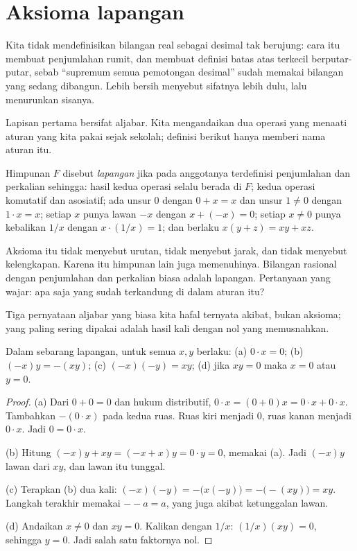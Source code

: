 \section{Aksioma lapangan}

Kita tidak mendefinisikan bilangan real sebagai desimal tak berujung: cara itu membuat
penjumlahan rumit, dan membuat definisi batas atas terkecil berputar-putar, sebab
``supremum semua pemotongan desimal'' sudah memakai bilangan yang sedang dibangun.
Lebih bersih menyebut sifatnya lebih dulu, lalu menurunkan sisanya.

Lapisan pertama bersifat aljabar. Kita mengandaikan dua operasi yang menaati aturan
yang kita pakai sejak sekolah; definisi berikut hanya memberi nama aturan itu.

\begin{definisi}[Lapangan]
Himpunan $F$ disebut \emph{lapangan} jika pada anggotanya terdefinisi penjumlahan dan
perkalian sehingga: hasil kedua operasi selalu berada di $F$; kedua operasi komutatif
dan asosiatif; ada unsur $0$ dengan $0+x=x$ dan unsur $1\neq 0$ dengan $1\cdot x=x$;
setiap $x$ punya lawan $-x$ dengan $x+(-x)=0$; setiap $x\neq 0$ punya kebalikan $1/x$
dengan $x\cdot(1/x)=1$; dan berlaku $x(y+z)=xy+xz$.
\end{definisi}

Aksioma itu tidak menyebut urutan, tidak menyebut jarak, dan tidak menyebut
kelengkapan. Karena itu himpunan lain juga memenuhinya. Bilangan rasional dengan
penjumlahan dan perkalian biasa adalah lapangan. Pertanyaan yang wajar: apa saja yang
sudah terkandung di dalam aturan itu?

Tiga pernyataan aljabar yang biasa kita hafal ternyata akibat, bukan aksioma; yang
paling sering dipakai adalah hasil kali dengan nol yang memusnahkan.

\begin{teorema}
Dalam sebarang lapangan, untuk semua $x,y$ berlaku: (a) $0\cdot x=0$;
(b) $(-x)y=-(xy)$; (c) $(-x)(-y)=xy$; (d) jika $xy=0$ maka $x=0$ atau $y=0$.
\end{teorema}

\begin{proof}
(a) Dari $0+0=0$ dan hukum distributif, $0\cdot x=(0+0)x=0\cdot x+0\cdot x$.
Tambahkan $-(0\cdot x)$ pada kedua ruas. Ruas kiri menjadi $0$, ruas kanan menjadi
$0\cdot x$. Jadi $0=0\cdot x$.

(b) Hitung $(-x)y+xy=(-x+x)y=0\cdot y=0$, memakai (a). Jadi $(-x)y$ lawan dari $xy$,
dan lawan itu tunggal.

(c) Terapkan (b) dua kali: $(-x)(-y)=-\bigl(x(-y)\bigr)=-\bigl(-(xy)\bigr)=xy$.
Langkah terakhir memakai $--a=a$, yang juga akibat ketunggalan lawan.

(d) Andaikan $x\neq 0$ dan $xy=0$. Kalikan dengan $1/x$: $(1/x)(xy)=0$, sehingga
$y=0$. Jadi salah satu faktornya nol.
\end{proof}

